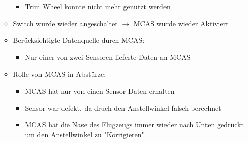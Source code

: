 \documentclass[11pt,a4paper]{article}
\begin{document}
\begin{itemize}
\begin{itemize}
\begin{itemize}
\item Trim Wheel konnte nicht mehr genutzt werden
\end{itemize}
\item Switch wurde wieder angeschaltet $\longrightarrow$ MCAS wurde wieder Aktiviert
\item Berücksichtigte Datenquelle durch MCAS:
\begin{itemize}
\item Nur einer von zwei Sensoren lieferte Daten an MCAS
\end{itemize}
\item Rolle von MCAS in Abstürze:
\begin{itemize}
\item MCAS hat nur von einen Sensor Daten erhalten
\item Sensor war defekt, da druch den Anstellwinkel falsch berechnet
\item MCAS hat die Nase des Flugzeugs immer wieder nach Unten gedrückt um den Anstellwinkel zu "Korrigieren"
\end{itemize}
\end{itemize}
\end{itemize}

\newpage
\end{document}

